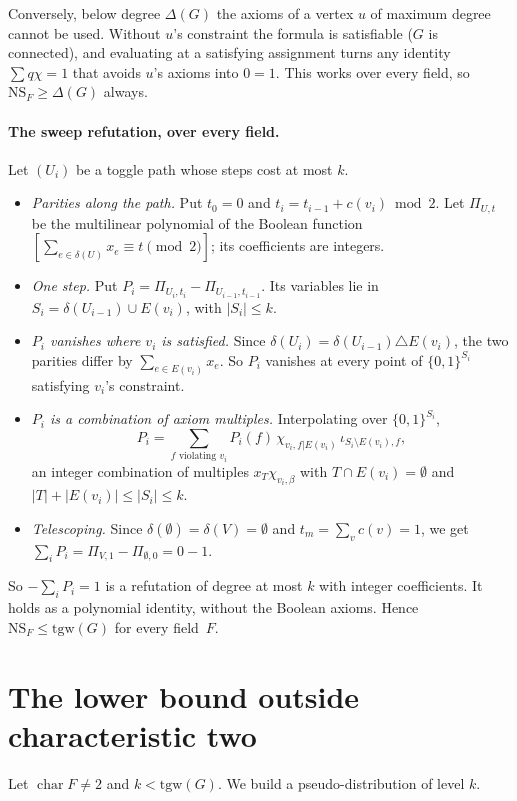 \documentclass[11pt]{article}
\theoremstyle{definition}
\theoremstyle{remark}
\newcommand{\NS}{\mathrm{NS}}
\newcommand{\tgw}{\mathrm{tgw}}
\newcommand{\ch}{\operatorname{char}}
\begin{document}
Conversely, below degree $\Delta(G)$ the axioms of a vertex $u$ of maximum
degree cannot be used. Without $u$'s constraint the formula is satisfiable
($G$ is connected), and evaluating at a satisfying assignment turns any
identity $\sum q\chi=1$ that avoids $u$'s axioms into $0=1$. This works over
every field, so $\NS_F\ge\Delta(G)$ always.

\paragraph{The sweep refutation, over every field.} Let $(U_i)$ be a toggle path
whose steps cost at most $k$.
\begin{itemize}
\item \emph{Parities along the path.} Put $t_0=0$ and $t_i=t_{i-1}+c(v_i)\bmod2$.
Let $\Pi_{U,t}$ be the multilinear polynomial of the Boolean function
$[\sum_{e\in\delta(U)}x_e\equiv t\pmod 2]$; its coefficients are integers.
\item \emph{One step.} Put $P_i=\Pi_{U_i,t_i}-\Pi_{U_{i-1},t_{i-1}}$. Its
variables lie in $S_i=\delta(U_{i-1})\cup E(v_i)$, with $|S_i|\le k$.
\item \emph{$P_i$ vanishes where $v_i$ is satisfied.} Since
$\delta(U_i)=\delta(U_{i-1})\triangle E(v_i)$, the two parities differ by
$\sum_{e\in E(v_i)}x_e$. So $P_i$ vanishes at every point of $\{0,1\}^{S_i}$
satisfying $v_i$'s constraint.
\item \emph{$P_i$ is a combination of axiom multiples.} Interpolating over
$\{0,1\}^{S_i}$,
\[
P_i=\sum_{f\text{ violating }v_i}P_i(f)\,\chi_{v_i,f|E(v_i)}\,\iota_{S_i\setminus E(v_i),f},
\]
an integer combination of multiples $x_T\chi_{v_i,\beta}$ with
$T\cap E(v_i)=\emptyset$ and $|T|+|E(v_i)|\le|S_i|\le k$.
\item \emph{Telescoping.} Since $\delta(\emptyset)=\delta(V)=\emptyset$ and
$t_m=\sum_v c(v)=1$, we get $\sum_iP_i=\Pi_{V,1}-\Pi_{\emptyset,0}=0-1$.
\end{itemize}
So $-\sum_iP_i=1$ is a refutation of degree at most $k$ with integer
coefficients. It holds as a polynomial identity, without the Boolean axioms.
Hence $\NS_F\le\tgw(G)$ for every field~$F$.

\section{The lower bound outside characteristic two}\label{sec:lower}

Let $\ch F\ne2$ and $k<\tgw(G)$. We build a pseudo-distribution of level $k$.
\end{document}
